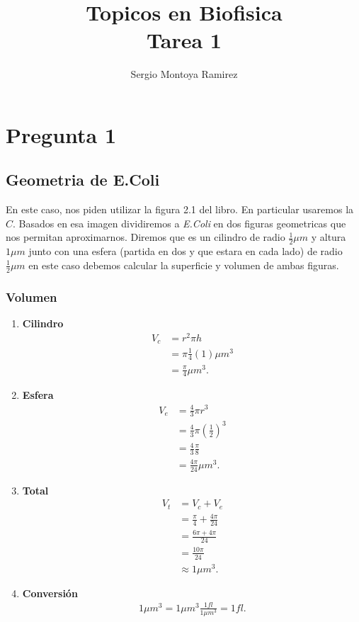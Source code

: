 \documentclass{report}
\title{\Huge{Topicos en Biofisica}\\Tarea 1}
\author{\huge{Sergio Montoya Ramirez}}
\date{}
\begin{document}
\maketitle
\newpage%
\tableofcontents
\pagebreak

\chapter{Pregunta 1}
\section{Geometria de E.Coli}

En este caso, nos piden utilizar la figura 2.1 del libro. En particular usaremos la $C$. Basados en esa imagen dividiremos a \textit{E.Coli} en dos figuras geometricas que nos permitan aproximarnos. Diremos que es un cilindro de radio $\frac{1}{2}\mu m$ y altura $1 \mu m$ junto con una esfera (partida en dos y que estara en cada lado) de radio  $\frac{1}{2} \mu m$ en este caso debemos calcular la superficie y volumen de ambas figuras.

\subsection{Volumen}

\begin{enumerate}
  \item \textbf{Cilindro}
    \begin{align*}
      V_{c} &= r^2\pi h \\
      &= \pi \frac{1}{4}\left( 1 \right) \mu m^{3}\\
      &= \frac{\pi}{4} \mu m^{3}
    .\end{align*}
  \item \textbf{Esfera}
    \begin{align*}
      V_{e} &= \frac{4}{3}\pi r^{3} \\
      &= \frac{4}{3}\pi \left( \frac{1}{2} \right)^{3} \\
      &= \frac{4}{3}\frac{\pi}{8} \\
      &= \frac{4\pi}{24}\mu m^{3}
    .\end{align*}
  \item \textbf{Total}
    \begin{align*}
      V_{t} &= V_{c} + V_{e} \\
     &= \frac{\pi}{4} + \frac{4\pi}{24} \\
     &= \frac{6\pi+4\pi}{24} \\
     &= \frac{10\pi}{24} \\
     &\approx 1 \mu m^{3}
    .\end{align*}
  \item \textbf{Conversión}
    \begin{align*}
      1 \mu m^{3} = 1 \mu m^{3} \frac{1 fl}{1 \mu m^{3}} = 1 fl
    .\end{align*}
\end{enumerate}
\end{document}
